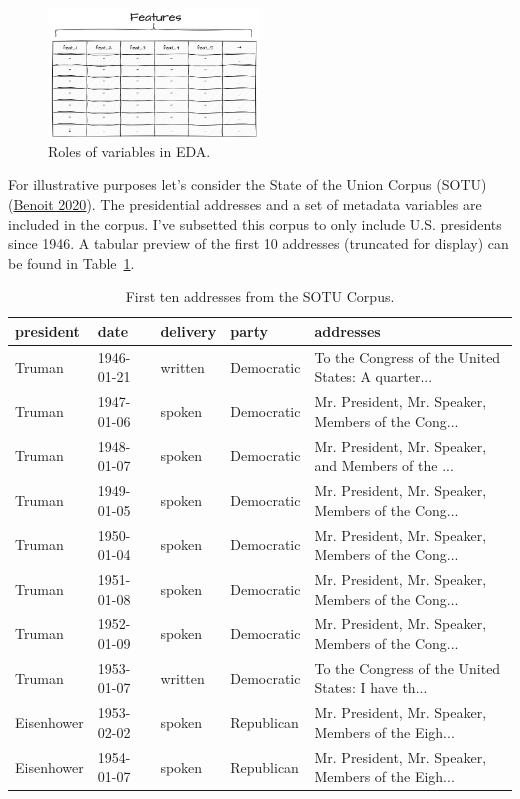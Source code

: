 \documentclass[
  letterpaper,
  DIV=11,
  numbers=noendperiod]{scrreport}
\theoremstyle{definition}
\theoremstyle{remark}
\begin{document}
\begin{figure}[H]

{\centering \includegraphics[width=0.5\textwidth,height=\textheight]{figures/aa-eda-variables.drawio.png}

}

\caption{\label{fig-eda-variables}Roles of variables in EDA.}

\end{figure}

For illustrative purposes let's consider the State of the Union Corpus
(SOTU) (\protect\hyperlink{ref-R-quanteda.corpora}{Benoit 2020}). The
presidential addresses and a set of metadata variables are included in
the corpus. I've subsetted this corpus to only include U.S. presidents
since 1946. A tabular preview of the first 10 addresses (truncated for
display) can be found in Table~\ref{tbl-eda-sotu-corpus}.

\hypertarget{tbl-eda-sotu-corpus}{}
\begin{table}
\caption{\label{tbl-eda-sotu-corpus}First ten addresses from the SOTU Corpus. }\tabularnewline

\centering
\begin{tabular}{l|l|l|l|l}
\hline
president & date & delivery & party & addresses\\
\hline
Truman & 1946-01-21 & written & Democratic & To the Congress of the United States: A quarter...\\
\hline
Truman & 1947-01-06 & spoken & Democratic & Mr. President, Mr. Speaker, Members of the Cong...\\
\hline
Truman & 1948-01-07 & spoken & Democratic & Mr. President, Mr. Speaker, and Members of the ...\\
\hline
Truman & 1949-01-05 & spoken & Democratic & Mr. President, Mr. Speaker, Members of the Cong...\\
\hline
Truman & 1950-01-04 & spoken & Democratic & Mr. President, Mr. Speaker, Members of the Cong...\\
\hline
Truman & 1951-01-08 & spoken & Democratic & Mr. President, Mr. Speaker, Members of the Cong...\\
\hline
Truman & 1952-01-09 & spoken & Democratic & Mr. President, Mr. Speaker, Members of the Cong...\\
\hline
Truman & 1953-01-07 & written & Democratic & To the Congress of the United States: I have th...\\
\hline
Eisenhower & 1953-02-02 & spoken & Republican & Mr. President, Mr. Speaker, Members of the Eigh...\\
\hline
Eisenhower & 1954-01-07 & spoken & Republican & Mr. President, Mr. Speaker, Members of the Eigh...\\
\hline
\end{tabular}
\end{table}
\end{document}
